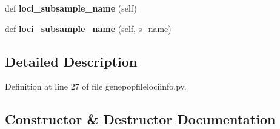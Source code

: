 \begin{DoxyCompactItemize}
\item 
def {\bfseries loci\+\_\+subsample\+\_\+name} (self)\hypertarget{classnegui_1_1genepopfilelociinfo_1_1GenepopFileLociInfo_a8556fc2201edb72248b464ccd45f1ddc}{}\label{classnegui_1_1genepopfilelociinfo_1_1GenepopFileLociInfo_a8556fc2201edb72248b464ccd45f1ddc}

\item 
def {\bfseries loci\+\_\+subsample\+\_\+name} (self, s\+\_\+name)\hypertarget{classnegui_1_1genepopfilelociinfo_1_1GenepopFileLociInfo_afb8099ba82dee18eea5975a8c80fe83c}{}\label{classnegui_1_1genepopfilelociinfo_1_1GenepopFileLociInfo_afb8099ba82dee18eea5975a8c80fe83c}

\end{DoxyCompactItemize}


\subsection{Detailed Description}


Definition at line 27 of file genepopfilelociinfo.\+py.



\subsection{Constructor \& Destructor Documentation}
